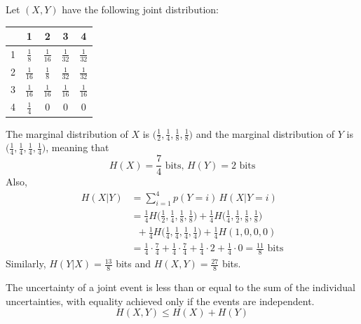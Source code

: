 \documentclass{article}
\begin{document}
    \begin{example}
      Let $(X, Y)$ have the following joint distribution: 
      \begingroup
      \renewcommand{\arraystretch}{1.4}
      \begin{center}
      \begin{tabular}{c|c|c|c|c}
         &1&2&3&4\\
         \hline
        1&$\frac{1}{8}$&$\frac{1}{16}$&$\frac{1}{32}$&$\frac{1}{32}$\\
        \hline
        2&$\frac{1}{16}$&$\frac{1}{8}$&$\frac{1}{32}$&$\frac{1}{32}$\\
        \hline
        3&$\frac{1}{16}$&$\frac{1}{16}$&$\frac{1}{16}$&$\frac{1}{16}$\\
        \hline
        4&$\frac{1}{4}$&$0$&$0$&$0$
      \end{tabular}
      \end{center}
      \endgroup
      The marginal distribution of $X$ is $\big(\frac{1}{2}, \frac{1}{4}, \frac{1}{8}, \frac{1}{8}\big)$ and the marginal distribution of $Y$ is $\big(\frac{1}{4}, \frac{1}{4}, \frac{1}{4}, \frac{1}{4}\big)$, meaning that
      \[H(X) = \frac{7}{4} \text{ bits,  } H(Y) = 2 \text{ bits}\]
      Also, 
      \begin{align*}
        H(X|Y) & = \sum_{i=1}^4 p(Y=i)\, H(X|Y = i) \\
        & = \frac{1}{4} H\bigg(\frac{1}{2}, \frac{1}{4}, \frac{1}{8}, \frac{1}{8}\bigg) + \frac{1}{4} H\bigg(\frac{1}{4}, \frac{1}{2}, \frac{1}{8}, \frac{1}{8}\bigg) \\
        & \;\; + \frac{1}{4} H\bigg(\frac{1}{4}, \frac{1}{4}, \frac{1}{4}, \frac{1}{4}\bigg) + \frac{1}{4}H(1, 0, 0, 0) \\
        & = \frac{1}{4} \cdot \frac{7}{4} + \frac{1}{4} \cdot \frac{7}{4} + \frac{1}{4} \cdot 2 + \frac{1}{4} \cdot 0 = \frac{11}{8} \text{ bits}
      \end{align*}
      Similarly, $H(Y|X) = \frac{13}{8}$ bits and $H(X, Y) = \frac{27}{8}$ bits. 
    \end{example}

    \begin{theorem}
      The uncertainty of a joint event is less than or equal to the sum of the individual uncertainties, with equality achieved only if the events are independent. 
      \begin{equation}
        H(X, Y) \leq H(X) + H(Y)
      \end{equation}
    \end{theorem}
\end{document}
